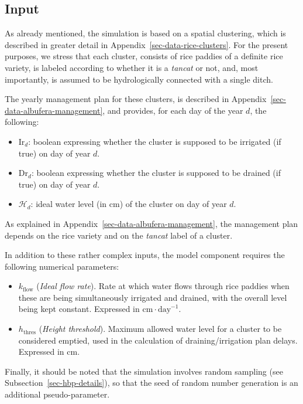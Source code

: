 \documentclass[
  letterpaper,
  DIV=11,
  numbers=noendperiod]{scrreprt}
\providecommand{\tightlist}{%
  \setlength{\itemsep}{0pt}\setlength{\parskip}{0pt}}\usepackage{longtable,booktabs,array}
\begin{document}
\subsection{Input}\label{input-2}

As already mentioned, the simulation is based on a spatial clustering,
which is described in greater detail in
Appendix~\ref{sec-data-rice-clusters}. For the present purposes, we
stress that each cluster, consists of rice paddies of a definite rice
variety, is labeled according to whether it is a \emph{tancat} or not,
and, most importantly, is assumed to be hydrologically connected with a
single ditch.

The yearly management plan for these clusters, is described in
Appendix~\ref{sec-data-albufera-management}, and provides, for each day
of the year \(d\), the following:

\begin{itemize}
\tightlist
\item
  \(\text{Ir}_d\): boolean expressing whether the cluster is supposed to
  be irrigated (if true) on day of year \(d\).
\item
  \(\text{Dr}_d\): boolean expressing whether the cluster is supposed to
  be drained (if true) on day of year \(d\).
\item
  \(\mathcal H _d\): ideal water level (in \(\text{cm}\)) of the cluster
  on day of year \(d\).
\end{itemize}

As explained in Appendix~\ref{sec-data-albufera-management}, the
management plan depends on the rice variety and on the \emph{tancat}
label of a cluster.

In addition to these rather complex inputs, the model component requires
the following numerical parameters:

\begin{itemize}
\item
  \(k_\text{flow}\) (\emph{Ideal flow rate}). Rate at which water flows
  through rice paddies when these are being simultaneously irrigated and
  drained, with the overall level being kept constant. Expressed in
  \(\text{cm}\cdot\text{day}^{-1}\).
\item
  \(h_{\text{thres}}\) (\emph{Height threshold}). Maximum allowed water
  level for a cluster to be considered emptied, used in the calculation
  of draining/irrigation plan delays. Expressed in \(\text{cm}\).
\end{itemize}

Finally, it should be noted that the simulation involves random sampling
(see Subsection~\ref{sec-hbp-details}), so that the seed of random
number generation is an additional pseudo-parameter.
\end{document}
